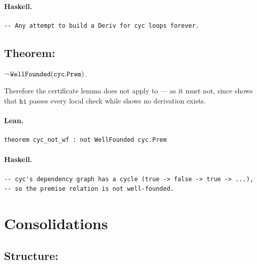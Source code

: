 \documentclass[11pt,a4paper]{article}
\begin{document}
\paragraph{Haskell.}
\begin{lstlisting}[style=haskell]
-- Any attempt to build a Deriv for cyc loops forever.
\end{lstlisting}


\subsection{Theorem: }

\begin{thm}
$\neg\,\texttt{WellFounded}(\texttt{cyc}.\texttt{Prem})$.

Therefore the certificate lemma does not apply to  --- as it must
not, since  shows that $\mathtt{hi}$ passes every
local check while  shows no derivation exists.
\end{thm}

\paragraph{Lean.}
\begin{lstlisting}[style=lean]
theorem cyc_not_wf : not WellFounded cyc.Prem
\end{lstlisting}

\paragraph{Haskell.}
\begin{lstlisting}[style=haskell]
-- cyc's dependency graph has a cycle (true -> false -> true -> ...),
-- so the premise relation is not well-founded.
\end{lstlisting}

\section{Consolidations}

\subsection{Structure: }
\end{document}
